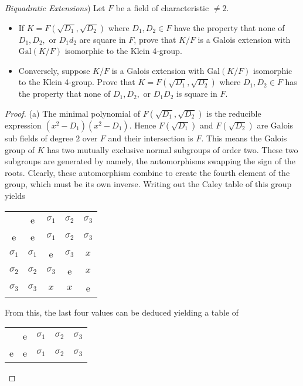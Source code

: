 \documentclass[10pt]{article}
\newcommand{\Gal}{\text{Gal}}
\newenvironment{problem}[2][Problem]{\begin{trivlist}
		\item[\hskip \labelsep {\bfseries #1}\hskip \labelsep {\bfseries #2.}]}{\end{trivlist}}
\begin{document}
	\begin{problem}{2.15}
		(\textit{Biquadratic Extensions}) Let $F$ be a field of characteristic $\not = 2$.
		\begin{itemize}
			\item[\textbf{(a)}] If $K=F(\sqrt{D_1}, \sqrt{D_2})$ where $D_1, D_2 \in F$ have the property that none of $D_1, D_2,$ or $D_1d_2$ are square in $F$, prove that $K/F$ is a Galois extension with $\Gal(K/F)$ isomorphic to the Klein 4-group.
			\item[\textbf{(b)}] Conversely, suppose $K/F$ is a Galois extension with $\Gal(K/F)$ isomorphic to the Klein 4-group. Prove that $K = F(\sqrt{D_1}, \sqrt{D_2})$ where $D_1, D_2 \in F$ has the property that none of $D_1, D_2,$ or $D_1D_2$ is square in $F$.
		\end{itemize}
		\begin{proof}{(a)}
			The minimal polynomial of $F(\sqrt{D_1}, \sqrt{D_2})$ is the reducible expression $(x^2-D_1)(x^2-D_1)$. Hence $F(\sqrt{D_1})$ and $F(\sqrt{D_2})$ are Galois sub fields of degree $2$ over $F$ and their intersection is $F$. This means the Galois group of $K$ has two mutually exclusive normal subgroups of order two. These two subgroups are generated by namely, the automorphisms swapping the sign of the roots. Clearly, these automorphism combine to create the fourth element of the group, which must be its own inverse. Writing out the Caley table of this group yields
			\begin{center}
				\noindent\begin{tabular}{c | c c c c}
								& e          & $\sigma_1$ & $\sigma_2$ & $\sigma_3$  \\
					\cline{1-4}
					e   		& e          & $\sigma_1$ & $\sigma_2$ & $\sigma_3$  \\
					$\sigma_1$  & $\sigma_1$ & e 		  & $\sigma_3$ & $x$ \\
					$\sigma_2$  & $\sigma_2$ & $\sigma_3$ & e 		   & $x$ \\
					$\sigma_3$ 	& $\sigma_3$ & $x$        & $x$        & e \\
				\end{tabular}
			\end{center}
			From this, the last four values can be deduced yielding a table of
			\begin{center}
				\noindent\begin{tabular}{c | c c c c}
					& e          & $\sigma_1$ & $\sigma_2$ & $\sigma_3$  \\
					\cline{1-4}
					e   		& e          & $\sigma_1$ & $\sigma_2$ & $\sigma_3$  \\

\end{tabular}
\end{center}
\end{proof}
\end{problem}
\end{document}
